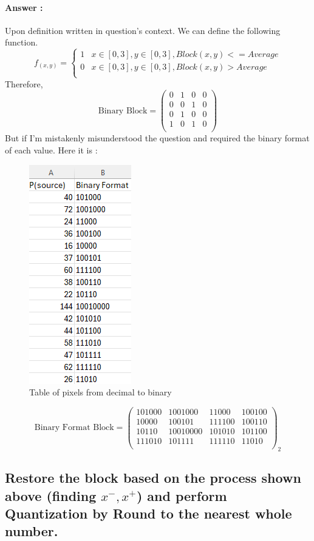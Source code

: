 \documentclass[letterpaper, 12pt]{article}
\begin{document}
\paragraph{Answer :}
Upon definition written in question's context. We can define the following function.
\[
f_{(x,y)} = \begin{cases} 
1 &  x \in [0,3],y\in[0,3] , Block(x,y) <= Average \\
0 &  x \in [0,3],y\in[0,3], Block(x,y) > Average\\
\end{cases}
\]
Therefore, 
\[\text{Binary Block} = \begin{pmatrix}
0 &1 &0 &0 \\
0 &0 &1 &0 \\
0 &1 &0 &0 \\
1 &0 &1 &0 \\
\end{pmatrix}\]
But if I'm mistakenly misunderstood the question and required the binary format of each value. Here it is :
\begin{figure}[htbp]
    \centering
    \includegraphics[width=0.25\linewidth]{FINAL_ASSIGNMENT/I_S_3.png}
    \caption{Table of pixels from decimal to binary}
    \label{fig:enter-label}
\end{figure}
\[\text{Binary Format Block} = \begin{pmatrix}
101000 &1001000 &11000 &100100 \\
10000 &100101 &111100 &100110 \\
10110 &10010000 &101010 &101100 \\
111010 &101111 &111110 &11010 \\
\end{pmatrix}_2\]

\subsection{Restore the block based on the process shown above (finding $x^-,x^+$) and perform Quantization by Round to the nearest whole number.}
\end{document}
